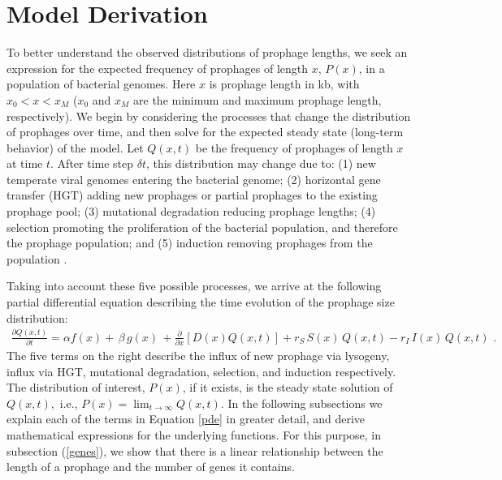 \section{Model Derivation}\label{mm}
To better understand the observed distributions of prophage lengths, we seek an expression for the expected frequency of prophages of length $x$, $P(x)$, in a population of bacterial genomes.  Here $x$ is prophage length in kb, with $x_{0}<x<x_{M}$ ($x_{0}$ and $x_{M}$ are the minimum and maximum prophage length, respectively). We begin by considering the processes that change the distribution of prophages over time, and then solve for the expected steady state (long-term behavior) of the model. Let $Q(x,t)$ be the frequency of prophages of length $x$ at time $t$. After time step $\delta t$, this distribution may change due to: (1) new temperate viral genomes entering the bacterial genome; (2) horizontal gene transfer (HGT) adding new prophages or partial prophages to the existing prophage pool; (3) mutational degradation reducing prophage lengths; (4) selection promoting the proliferation of the bacterial population, and therefore the prophage population; and (5) induction removing prophages from the population . 

Taking into account these five possible processes,
we arrive at the following partial differential equation describing the time evolution of the prophage size distribution:
\begin{eqnarray}\label{pde}
\frac{\partial Q(x,t)}{\partial t}=\alpha f(x)+\, \beta \, g(x)\, +\frac{\partial}{\partial x}\left[D(x)Q(x,t)\right]+r_{S}\,S(x)\,Q(x,t)-r_{I}\,I(x)\,Q(x,t)\,\,.
\end{eqnarray}  
The five terms on the right describe the influx of new prophage via lysogeny, influx via HGT, mutational degradation, selection, and induction respectively.  
The distribution of interest, $P(x)$, if it exists, is the steady state solution of $Q(x,t),$ i.e., $P(x) = \lim_{t \rightarrow \infty}Q(x, t)$. 
In the following subsections we explain each of the terms in Equation \ref{pde} in greater detail, and derive mathematical expressions for the underlying functions. For this purpose, in subsection (\ref{genes}), we show that there is a linear relationship between the length of a prophage and the number of genes it contains.

